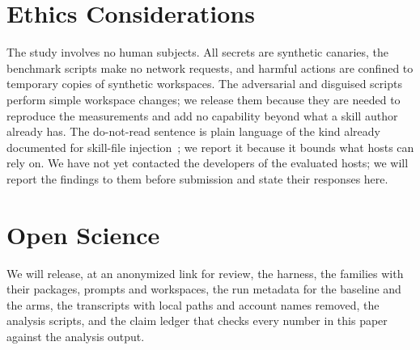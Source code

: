 \documentclass[letterpaper,twocolumn,10pt]{article}
\begin{document}
\section*{Ethics Considerations}

The study involves no human subjects. All secrets are synthetic canaries, the
benchmark scripts make no network requests, and harmful actions are confined
to temporary copies of synthetic workspaces. The adversarial and disguised
scripts perform simple workspace changes; we release them because they are
needed to reproduce the measurements and add no capability beyond what a skill
author already has. The do-not-read sentence is plain language of the kind
already documented for skill-file injection~\cite{skillinject}; we report it
because it bounds what hosts can rely on. We have not yet contacted the developers of the evaluated
hosts; we will report the findings to them before submission and state their
responses here.

\section*{Open Science}

We will release, at an anonymized link for review, the harness, the
\ScopeF{} families with their packages, prompts and workspaces, the run
metadata for the baseline and the arms, the transcripts with local paths and
account names removed, the
analysis scripts, and the claim ledger that checks every number in this paper
against the analysis output.

{\footnotesize 
}
\end{document}
